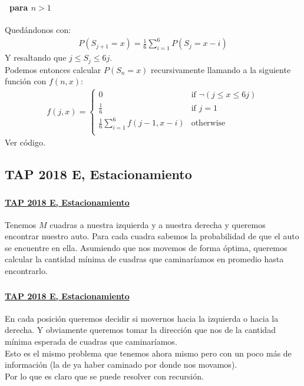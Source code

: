\documentclass[../main.tex]{subfiles}
\begin{document}
\begin{frame}
  \frametitle{\SECTIONB}
  \framesubtitle{\EJA\ para \(n > 1\)}

  Quedándonos con:
  \begin{gather*}
    P(S_{j+1} = x) = \frac{1}{6}\sum_{i = 1}^{6}P(S_{j} = x - i)
  \end{gather*}
  Y resaltando que \(j \leq S_{j} \leq 6j\). \\
  Podemos entonces calcular \(P(S_{n} = x)\) recursivamente llamando a la siguiente función con \(f(n, x)\):
  \begin{gather*}
    f(j, x) = \begin{cases}
      0 & \text{if } \neg(j \leq x \leq 6j) \\
      \frac{1}{6} & \text{if } j = 1 \\
      \frac{1}{6}\sum_{i = 1}^{6}f(j-1, x-i) & \text{otherwise} \\
    \end{cases}
  \end{gather*} \pause
  Ver código.
\end{frame}

\newcommand{\EJB}{\href{https://codeforces.com/group/YjFmW2O15Q/contest/101919}{TAP 2018 E, Estacionamiento}}
\subsection{TAP 2018 E, Estacionamiento}

\begin{frame}
  \frametitle{\SECTIONB}
  \framesubtitle{\EJB}

  Tenemos \(M\) cuadras a nuestra izquierda y a nuestra derecha y queremos encontrar nuestro auto. Para cada cuadra sabemos la probabilidad de que el auto se encuentre en ella. Asumiendo que nos movemos de forma óptima, queremos calcular la cantidad mínima de cuadras que caminaríamos en promedio hasta encontrarlo.

\end{frame}

\begin{frame}
  \frametitle{\SECTIONB}
  \framesubtitle{\EJB}

  En cada posición queremos decidir si movernos hacia la izquierda o hacia la derecha. \pause Y obviamente queremos tomar la dirección que nos de la cantidad mínima esperada de cuadras que caminaríamos. \pause \\
  Esto es el mismo problema que tenemos ahora mismo pero con un poco más de información (la de ya haber caminado por donde nos movamos). \pause \\
  Por lo que es claro que se puede resolver con recursión.
\end{frame}
\end{document}
